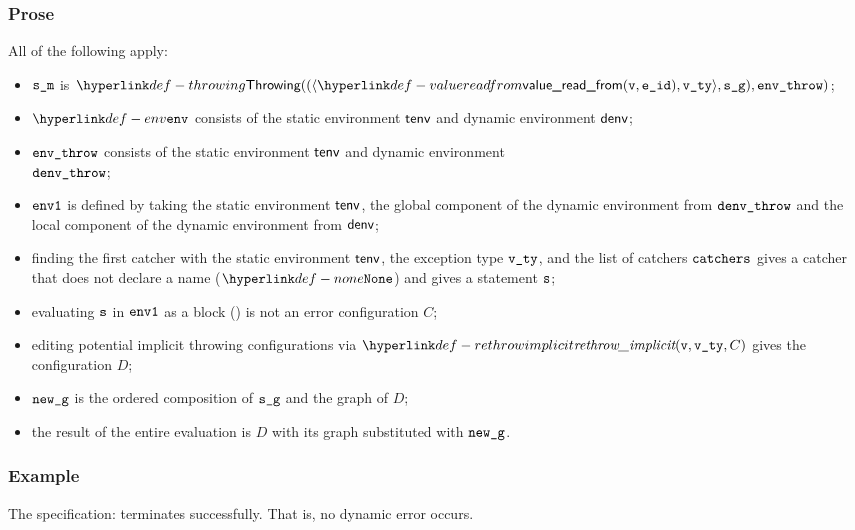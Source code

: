 \subsubsection{Prose}
All of the following apply:
\begin{itemize}
  \item $\texttt{s\_m}$ is $\Throwing((\langle \valuereadfrom(\vv, \eid), \vvty \rangle, \sg), \envthrow)$;
  \item $\env$ consists of the static environment $\textsf{tenv}$ and dynamic environment $\textsf{denv}$;
  \item $\texttt{env\_throw}$ consists of the static environment $\textsf{tenv}$ and dynamic environment \\ $\texttt{denv\_throw}$;
  \item $\texttt{env1}$ is defined by taking the static environment $\textsf{tenv}$, the global component of the dynamic
        environment from $\texttt{denv\_throw}$ and the local component of the dynamic environment from $\textsf{denv}$;
  \item finding the first catcher with the static environment $\textsf{tenv}$, the exception type $\texttt{v\_ty}$,
  and the list of catchers $\texttt{catchers}$ gives a catcher that does not declare a name ($\None$) and gives a statement $\texttt{s}$;
  \item evaluating $\texttt{s}$ in $\texttt{env1}$ as a block () is not an error
        configuration $C$\ProseOrError;
  \item editing potential implicit throwing configurations via $\rethrowimplicit(\vv, \vvty, C)$
        gives the configuration $D$;
  \item $\texttt{new\_g}$ is the ordered composition of $\texttt{s\_g}$ and the graph of $D$;
  \item the result of the entire evaluation is $D$ with its graph substituted with $\texttt{new\_g}$.
\end{itemize}

\subsubsection{Example}
The specification:
terminates successfully. That is, no dynamic error occurs.


